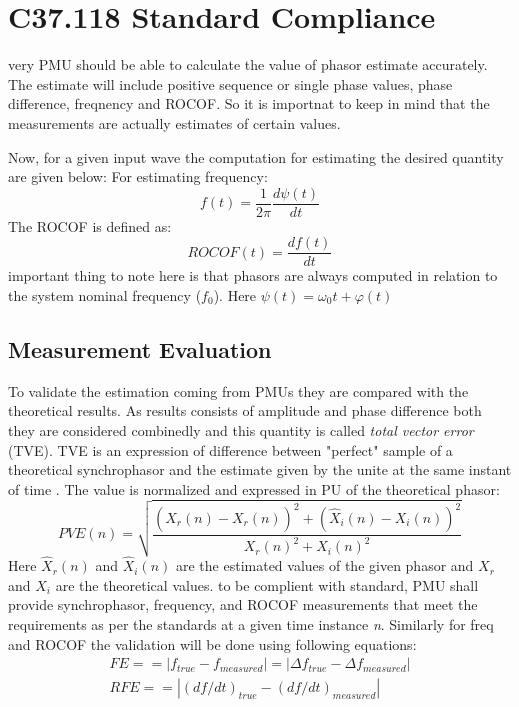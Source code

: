 \section{C37.118 Standard Compliance}
very PMU should be able to calculate the value of phasor estimate accurately. The estimate will include positive sequence or single phase values, phase difference, freqnency and ROCOF. So it is importnat to keep in mind that the measurements are actually estimates of certain values.

Now, for a given input wave the computation for estimating the desired quantity are given below:
For estimating frequency:
\begin{equation}
f(t) = \frac{1}{2\pi} \dfrac{d\psi(t)}{dt}
\end{equation}
The ROCOF is defined as:
\begin{equation}
ROCOF(t) = \dfrac{df(t)}{dt}
\end{equation}
important thing to note here is that phasors are always computed in relation to the system nominal frequency ($f_0$). Here $\psi(t) = \omega_0 t + \varphi(t)$

\subsection{Measurement Evaluation}
To validate the estimation coming from PMUs they are compared with the theoretical results. As results consists of amplitude and phase difference both they are considered combinedly and this quantity is called \textit{total vector error} (TVE). TVE is an expression of difference between "perfect" sample of a theoretical synchrophasor and the estimate given by the unite at the same instant of time \cite{std:c37}. The value is normalized and expressed in PU of the theoretical phasor:
\begin{equation}
PVE(n) = \sqrt{\frac{ (\hat{X}_r(n) - X_r(n))^2 + (\hat{X}_i(n)-X_i(n))^2} {X_r(n)^2 + X_i(n)^2}}
\end{equation}
Here $ \hat{X}_r (n)$ and $\hat{X}_i(n) $ are the estimated values of the given phasor and $X_r$ and $X_i$ are the theoretical values.
to be complient with standard, PMU shall provide synchrophasor, frequency, and ROCOF measurements that meet the requirements as per the standards at a given time instance \textit{n}. Similarly for freq and ROCOF the validation will be done using following equations:
\begin{eqnarray}
FE == |f_{true}-f_{measured}| = |\Delta f_{true}-\Delta f_{measured}| \\
RFE == |(df/dt)_{true}-(df/dt)_{measured} |
\end{eqnarray}


